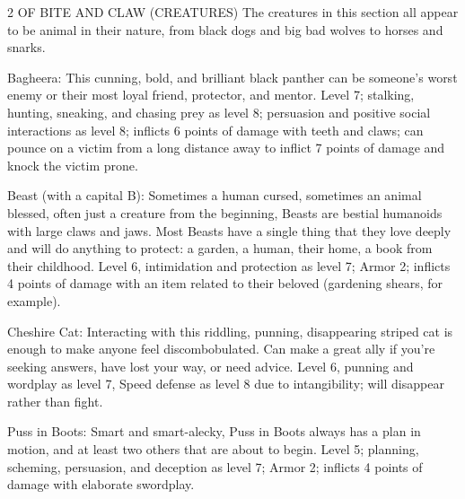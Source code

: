 \begin{multicols}{2}
OF BITE AND CLAW (CREATURES)
The creatures in this section all appear to be animal in their nature, from black dogs and big bad wolves to horses and snarks.

Bagheera: This cunning, bold, and brilliant black panther can be someone’s worst enemy or their most loyal friend, protector, and mentor.
Level 7; stalking, hunting, sneaking,
and chasing prey as level 8; persuasion and positive social interactions as level 8; inflicts 6 points of damage with teeth and claws; can pounce on a victim from a long distance away to inflict 7 points of damage and knock the victim prone.

Beast (with a capital B): Sometimes a human cursed, sometimes an animal blessed, often just a creature from the beginning, Beasts are bestial humanoids with large claws and jaws. Most Beasts have a single thing that they love deeply and will do anything to protect: a garden, a human, their home, a book from their childhood.
Level 6, intimidation and protection as level 7; Armor 2; inflicts 4 points of damage with an item related to their beloved (gardening shears, for example).

Cheshire Cat: Interacting with this riddling, punning, disappearing striped cat is enough to make anyone feel discombobulated. Can make a great ally if you’re seeking answers, have lost your way, or need advice.
Level 6, punning and wordplay as level 7, Speed defense as level 8 due to intangibility; will disappear rather than fight.

Puss in Boots: Smart and smart-alecky, Puss in Boots always has a plan in motion, and at least two others that are about to begin.
Level 5; planning, scheming, persuasion, and deception as
level 7; Armor 2; inflicts 4 points of damage with elaborate swordplay.


\end{multicols}
